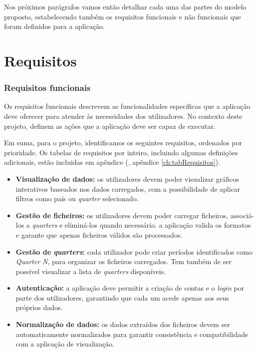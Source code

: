 Nos próximos parágrafos vamos então detalhar cada uma das partes do modelo proposto, estabelecendo também os requisitos funcionais e não funcionais que foram definidos para a aplicação.

\section{Requisitos}
\label{sec:requisitos}

\subsubsection{Requisitos funcionais}

Os requisitos funcionais descrevem as funcionalidades específicas que a aplicação deve oferecer para atender às necessidades dos utilizadores. No contexto deste projeto, definem as ações que a aplicação deve ser capaz de executar.

Em suma, para o projeto, identificamos os seguintes requisitos, ordenados por prioridade. Os tabelas de requisitos por inteiro, incluindo algumas definições adicionais, estão incluidas em apêndice (\cf, apêndice \ref{ch:tabRequisitos}).

\begin{itemize}
    \item \textbf{Visualização de dados:} os utilizadores devem poder visualizar gráficos interativos baseados nos dados carregados, com a possibilidade de aplicar filtros como país ou \textit{quarter} selecionado.

    \item \textbf{Gestão de ficheiros:} os utilizadores devem poder carregar ficheiros, associá-los a \textit{quarters} e eliminá-los quando necessário. a aplicação valida os formatos e garante que apenas ficheiros válidos são processados.
    
    \item \textbf{Gestão de \textit{quarters}:} cada utilizador pode criar períodos identificados como \textit{Quarter N}, para organizar os ficheiros carregados. Tem também de ser possível visualizar a lista de \textit{quarters} disponíveis.

    \item \textbf{Autenticação:} a aplicação deve permitir a criação de contas e o \textit{login} por parte dos utilizadores, garantindo que cada um acede apenas aos seus próprios dados.

    \item \textbf{Normalização de dados:} os dados extraídos dos ficheiros devem ser automaticamente normalizados para garantir consistência e compatibilidade com a aplicação de visualização.
    
\end{itemize}


